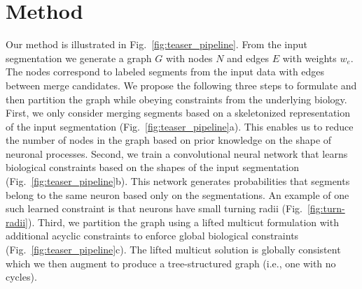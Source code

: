 
\section{Method}


Our method is illustrated in Fig.~\ref{fig:teaser_pipeline}.
From the input segmentation we generate a graph $G$ with nodes $N$ and edges $E$ with weights $w_e$. 
The nodes correspond to labeled segments from the input data with edges between merge candidates.
We propose the following three steps to formulate and then partition the graph while obeying constraints from the underlying biology.
First, we only consider merging segments based on a skeletonized representation of the input segmentation (Fig.~\ref{fig:teaser_pipeline}a).
This enables us to reduce the number of nodes in the graph based on prior knowledge on the shape of neuronal processes.
Second, we train a convolutional neural network that learns biological constraints based on the shapes of the input segmentation (Fig.~\ref{fig:teaser_pipeline}b).
This network generates probabilities that segments belong to the same neuron based only on the segmentations. 
An example of one such learned constraint is that neurons have small turning radii (Fig.~\ref{fig:turn-radii}).
Third, we partition the graph using a lifted multicut formulation with additional acyclic constraints to enforce global biological constraints (Fig.~\ref{fig:teaser_pipeline}c).
The lifted multicut solution is globally consistent which we then augment to produce a tree-structured graph (i.e., one with no cycles).

